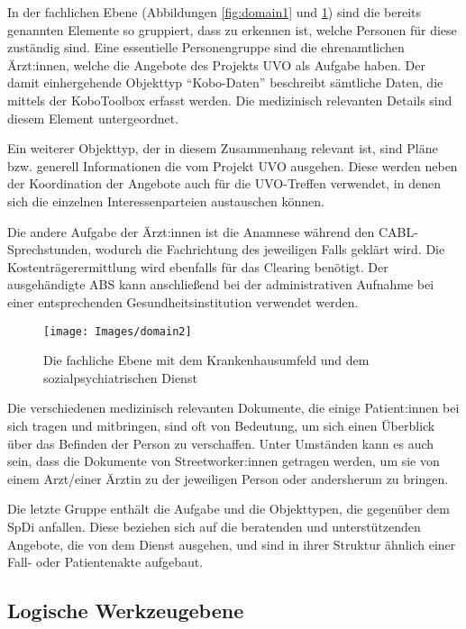 In der fachlichen Ebene (Abbildungen \ref{fig:domain1} und \ref{fig:domain2}) sind die bereits genannten Elemente so gruppiert, dass zu erkennen ist, welche Personen für diese zuständig sind. Eine essentielle Personengruppe sind die ehrenamtlichen Ärzt:innen, welche die Angebote des Projekts \ac{UVO} als Aufgabe haben. Der damit einhergehende Objekttyp \enquote{Kobo-Daten} beschreibt sämtliche Daten, die mittels der KoboToolbox erfasst werden. Die medizinisch relevanten Details sind diesem Element untergeordnet.

Ein weiterer Objekttyp, der in diesem Zusammenhang relevant ist, sind Pläne bzw. generell Informationen die vom Projekt \ac{UVO} ausgehen. Diese werden neben der Koordination der Angebote auch für die \ac{UVO}-Treffen verwendet, in denen sich die einzelnen Interessenparteien austauschen können.

Die andere Aufgabe der Ärzt:innen ist die Anamnese während den \ac{CABL}-Sprechstunden, wodurch die Fachrichtung des jeweiligen Falls geklärt wird. Die Kostenträgerermittlung wird ebenfalls für das Clearing benötigt. Der ausgehändigte \ac{ABS} kann anschließend bei der administrativen Aufnahme bei einer entsprechenden Gesundheitsinstitution verwendet werden.

\begin{figure}[h]
	\centering
	\texttt{[image: Images/domain2]}
	\caption[Fachliche Ebene - UKL und SpDi]{Die fachliche Ebene mit dem Krankenhausumfeld und dem sozialpsychiatrischen Dienst}
	\label{fig:domain2}
\end{figure}

Die verschiedenen medizinisch relevanten Dokumente, die einige Patient:innen bei sich tragen und mitbringen, sind oft von Bedeutung, um sich einen Überblick über das Befinden der Person zu verschaffen. Unter Umständen kann es auch sein, dass die Dokumente von Streetworker:innen getragen werden, um sie von einem Arzt/einer Ärztin zu der jeweiligen Person oder andersherum zu bringen.

Die letzte Gruppe enthält die Aufgabe und die Objekttypen, die gegenüber dem \ac{SpDi} anfallen. Diese beziehen sich auf die beratenden und unterstützenden Angebote, die von dem Dienst ausgehen, und sind in ihrer Struktur ähnlich einer Fall- oder Patientenakte aufgebaut.

\subsection{Logische Werkzeugebene}

